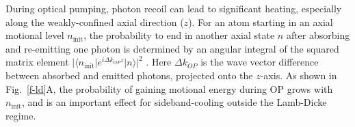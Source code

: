 \documentclass[aps,prl,twocolumn,groupedaddress]{revtex4-1}
\begin{document}


During optical pumping, photon recoil can lead to significant heating, especially along the weakly-confined axial direction ($z$).  For an atom starting in an axial motional level $n_{\textrm{init}}$, the probability to end in another axial state $n$ after absorbing and re-emitting one photon is determined by an angular integral of the squared matrix element $|\langle n_{\textrm{init}}|e^{i \Delta k_{OP} z}| n\rangle|^2$ \cite{ItanoWineland1979}. Here $\Delta k_{OP}$ is the wave vector difference between absorbed and emitted photons, projected onto the $z$-axis.  As shown in Fig.~\ref{f-ld}A, the probability of gaining motional energy during OP grows with $n_{\textrm{init}}$, and is an important effect for sideband-cooling outside the Lamb-Dicke regime.
\end{document}
